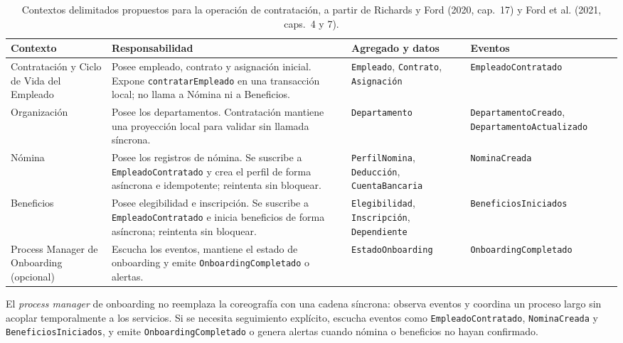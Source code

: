 \documentclass[12pt,a4paper]{article}
\begin{document}
\begin{table}[ht]
\centering
\scriptsize
\setlength{\tabcolsep}{3pt}
\begin{tabular}{|>{\raggedright\arraybackslash}p{2.6cm}|>{\raggedright\arraybackslash}p{5.2cm}|>{\raggedright\arraybackslash}p{3.0cm}|>{\raggedright\arraybackslash}p{4.2cm}|}
\hline
\textbf{Contexto} & \textbf{Responsabilidad} & \textbf{Agregado y datos} & \textbf{Eventos} \\
\hline
Contratación y Ciclo de Vida del Empleado & Posee empleado, contrato y asignación inicial. Expone \texttt{contratarEmpleado} en una transacción local; no llama a Nómina ni a Beneficios. & \texttt{Empleado}, \texttt{Contrato}, \texttt{Asignación} & \texttt{EmpleadoContratado} \\
\hline
Organización & Posee los departamentos. Contratación mantiene una proyección local para validar sin llamada síncrona. & \texttt{Departamento} & \texttt{DepartamentoCreado}, \texttt{Departamento}\allowbreak\texttt{Actualizado} \\
\hline
Nómina & Posee los registros de nómina. Se suscribe a \texttt{EmpleadoContratado} y crea el perfil de forma asíncrona e idempotente; reintenta sin bloquear. & \texttt{PerfilNomina}, \texttt{Deducción}, \texttt{CuentaBancaria} & \texttt{NominaCreada} \\
\hline
Beneficios & Posee elegibilidad e inscripción. Se suscribe a \texttt{EmpleadoContratado} e inicia beneficios de forma asíncrona; reintenta sin bloquear. & \texttt{Elegibilidad}, \texttt{Inscripción}, \texttt{Dependiente} & \texttt{BeneficiosIniciados} \\
\hline
Process Manager de Onboarding (opcional) & Escucha los eventos, mantiene el estado de onboarding y emite \texttt{OnboardingCompletado} o alertas. & \texttt{EstadoOnboarding} & \texttt{OnboardingCompletado} \\
\hline
\end{tabular}
\caption{Contextos delimitados propuestos para la operación de contratación, a partir de Richards y Ford (2020, cap.~17) y Ford et al. (2021, caps.~4 y 7).}
\label{tab:contextos-rrhh}
\end{table}

El \emph{process manager} de onboarding no reemplaza la coreografía con una cadena síncrona: observa eventos y coordina un proceso largo sin acoplar temporalmente a los servicios. Si se necesita seguimiento explícito, escucha eventos como \texttt{EmpleadoContratado}, \texttt{NominaCreada} y \texttt{BeneficiosIniciados}, y emite \texttt{OnboardingCompletado} o genera alertas cuando nómina o beneficios no hayan confirmado.
\end{document}

